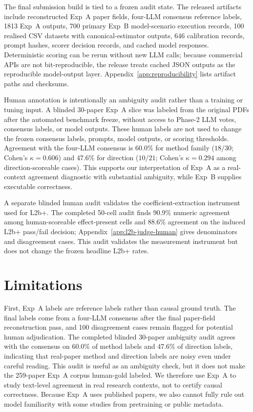 \documentclass{article}
\begin{document}
The final submission build is tied to a frozen audit state. The released
artifacts include reconstructed Exp~A paper fields, four-LLM consensus
reference labels, 1813 Exp~A outputs, 700 primary Exp~B model-scenario
execution records, 100 realised CSV datasets with canonical-estimator
outputs, 646 calibration records, prompt hashes, scorer decision records,
and cached model responses. Deterministic scoring can be rerun without
new LLM calls; because commercial APIs are not bit-reproducible, the
release treats cached JSON outputs as the reproducible model-output layer.
Appendix~\ref{app:reproducibility} lists artifact paths and checksums.

Human annotation is intentionally an ambiguity audit rather than a
training or tuning input. A blinded 30-paper Exp~A slice was labeled from
the original PDFs after the automated benchmark freeze, without access to
Phase-2 LLM votes, consensus labels, or model outputs. These human labels
are not used to change the frozen consensus labels, prompts, model
outputs, or scoring thresholds. Agreement with the four-LLM consensus is
60.0\% for method family ($18/30$; Cohen's $\kappa=0.606$) and 47.6\% for
direction ($10/21$; Cohen's $\kappa=0.294$ among direction-scoreable
cases). This supports our interpretation of Exp~A as a real-context
agreement diagnostic with substantial ambiguity, while Exp~B supplies
executable correctness.

A separate blinded human audit validates the coefficient-extraction
instrument used for L2b+. The completed 50-cell audit finds 90.9\%
numeric agreement among human-scoreable effect-present cells and 88.6\%
agreement on the induced L2b+ pass/fail decision; Appendix~\ref{app:l2b-judge-human}
gives denominators and disagreement cases. This audit validates the
measurement instrument but does not change the frozen headline L2b+
rates.

\section{Limitations}

First, Exp~A labels are reference labels rather than causal ground truth.
The final labels come from a four-LLM consensus after the final
paper-field reconstruction pass, and 100 disagreement cases remain
flagged for potential human adjudication. The completed blinded 30-paper
ambiguity audit agrees with the consensus on 60.0\% of method labels and
47.6\% of direction labels, indicating that real-paper method and
direction labels are noisy even under careful reading. This audit is
useful as an ambiguity check, but it does not make the 259-paper Exp~A
corpus human-gold labeled. We therefore use Exp~A to study text-level
agreement in real research contexts, not to certify causal correctness.
Because Exp~A uses published papers, we also cannot fully rule out
model familiarity with some studies from pretraining or public metadata.
\end{document}
